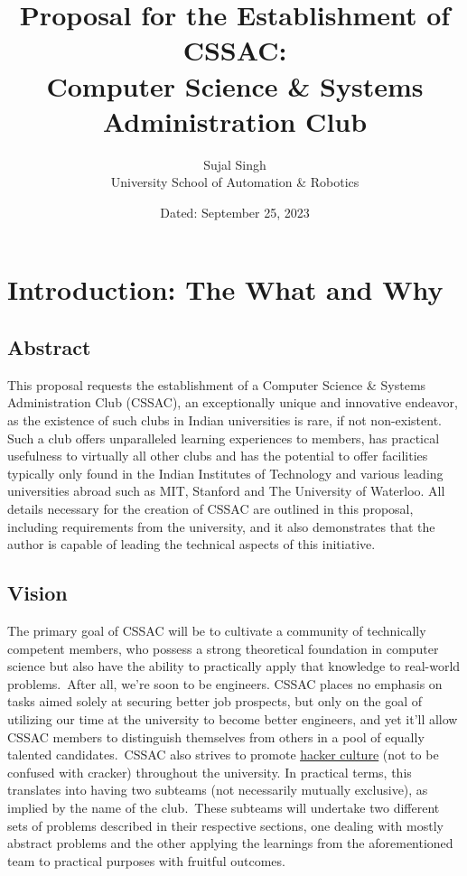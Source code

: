 \documentclass[11pt,twocolumn,oneside]{book}
\title{\textbf{Proposal for the Establishment of CSSAC: \\ Computer Science \& Systems Administration Club}}
\author{Sujal Singh \\ University School of Automation \& Robotics}
\date{Dated: September 25, 2023}
\begin{document}
    \maketitle
    \tableofcontents


    \chapter{Introduction: The What and Why}\label{ch:introduction}


    \section{Abstract}\label{sec:abstract}
    This proposal requests the establishment of a Computer Science \& Systems Administration Club (CSSAC), an
    exceptionally unique and innovative endeavor, as the existence of such clubs in Indian universities is rare, if not
    non-existent.
    Such a club offers unparalleled learning experiences to members, has practical usefulness to virtually all other
    clubs and has the potential to offer facilities typically only found in the Indian Institutes of Technology and
    various leading universities abroad such as MIT, Stanford and The University of Waterloo.
    All details necessary for the creation of CSSAC are outlined in this proposal, including requirements from the
    university, and it also demonstrates that the author is capable of leading the technical aspects of this initiative.


    \section{Vision}\label{sec:vision}
    The primary goal of CSSAC will be to cultivate a community of technically competent members, who possess a strong
    theoretical foundation in computer science but also have the ability to practically apply that knowledge to
    real-world problems.\ After all, we're soon to be engineers.
    CSSAC places no emphasis on tasks aimed solely at securing better job prospects, but only on the goal of
    utilizing our time at the university to become better engineers, and yet it'll allow CSSAC members to distinguish
    themselves from others in a pool of equally talented candidates.\ CSSAC also strives to promote
    \href{https://wikipedia.org/wiki/Hacker_culture}{\color{blue}\underline{hacker culture}} (not to be confused with
    cracker) throughout the university.
    In practical terms, this translates into having two subteams (not necessarily mutually exclusive), as implied by the
    name of the club.\ These subteams will undertake two different sets of problems described in their respective
    sections, one dealing with mostly abstract problems and the other applying the learnings from the aforementioned
    team to practical purposes with fruitful outcomes.
\end{document}
